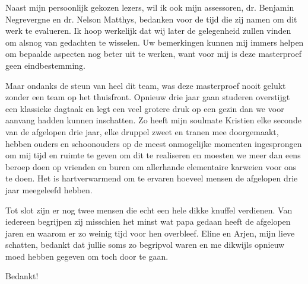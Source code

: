 \begin{preface}
Naast mijn persoonlijk gekozen lezers, wil ik ook mijn assessoren, dr. Benjamin
Negrevergne en dr. Nelson Matthys, bedanken voor de tijd die zij namen om dit
werk te evalueren. Ik hoop werkelijk dat wij later de gelegenheid zullen vinden
om alsnog van gedachten te wisselen. Uw bemerkingen kunnen mij immers helpen om
bepaalde aspecten nog beter uit te werken, want voor mij is deze masterproef
geen eindbestemming.

Maar ondanks de steun van heel dit team, was deze masterproef nooit gelukt
zonder een team op het thuisfront. Opnieuw drie jaar gaan studeren overstijgt
een klassieke dagtaak en legt een veel grotere druk op een gezin dan we voor
aanvang hadden kunnen inschatten. Zo heeft mijn soulmate Kristien elke seconde
van de afgelopen drie jaar, elke druppel zweet en tranen mee doorgemaakt,
hebben ouders en schoonouders op de meest onmogelijke momenten ingesprongen om
mij tijd en ruimte te geven om dit te realiseren en moesten we meer dan eens
beroep doen op vrienden en buren om allerhande elementaire karweien voor ons te
doen. Het is hartverwarmend om te ervaren hoeveel mensen de afgelopen drie jaar
meegeleefd hebben.

Tot slot zijn er nog twee mensen die echt een hele dikke knuffel verdienen. Van
iedereen begrijpen zij misschien het minst wat papa gedaan heeft de afgelopen
jaren en waarom er zo weinig tijd voor hen overbleef. Eline en Arjen, mijn
lieve schatten, bedankt dat jullie soms zo begripvol waren en me dikwijls
opnieuw moed hebben gegeven om toch door te gaan.

\bigskip

Bedankt!

\end{preface}
